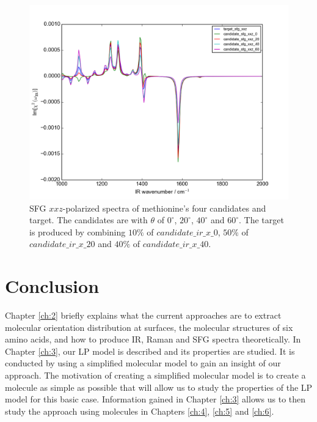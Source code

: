 \begin{figure}[!ht]
\centering
\includegraphics[scale=0.5]{Figures/Met_candidates_plotting_sfg_xxz.png}
\caption{SFG $xxz$-polarized spectra of methionine's four candidates and target. The candidates are with $\theta$ of $0^{\circ}$, $20^{\circ}$, $40^{\circ}$ and $60^{\circ}$. The target is produced by combining $10\%$ of $candidate\_ir\_x\_0$, $50\%$ of $candidate\_ir\_x\_20$ and $40\%$ of $candidate\_ir\_x\_40$.} \label{fig:2.5}
\end{figure}

\section{Conclusion}
Chapter \ref{ch:2} briefly explains what the current approaches are to extract molecular orientation distribution at surfaces, the molecular structures of six amino acids, and how to produce IR, Raman and SFG spectra theoretically. In Chapter \ref{ch:3}, our LP model is described and its properties are studied. It is conducted by using a simplified molecular model to gain an insight of our approach. The motivation of creating a simplified molecular model is to create a molecule as simple as possible that will allow us to study the properties of the LP model for this basic case. Information gained in Chapter \ref{ch:3} allows us to then study the approach using molecules in Chapters \ref{ch:4}, \ref{ch:5} and \ref{ch:6}.